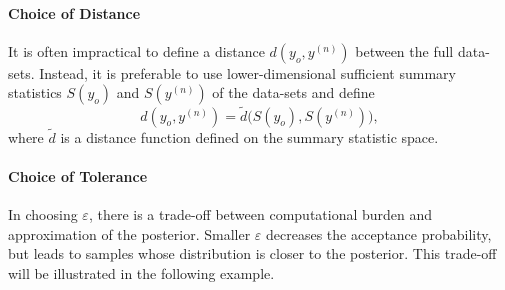 \medskip
\noindent{}
\medskip

\paragraph{Choice of Distance}
It is often impractical to define a distance $d(y_o, y^{(n)})$ between the full
data-sets. Instead, it is preferable to use lower-dimensional sufficient summary statistics $S(y_o)$
and $S(y^{(n)})$ of the data-sets and define
\[
  d(y_o, y^{(n)}) = \tilde{d}\bigl(S(y_o), S(y^{(n)})\bigr),
\]
where $\tilde{d}$ is a distance function defined on the summary statistic space.

\paragraph{Choice of Tolerance}
In choosing $\varepsilon$, there is a trade-off between computational burden and
approximation of the posterior. Smaller $\varepsilon$ decreases the acceptance probability, but leads to
samples whose distribution is closer to the posterior. This trade-off will be illustrated in the
following example.

